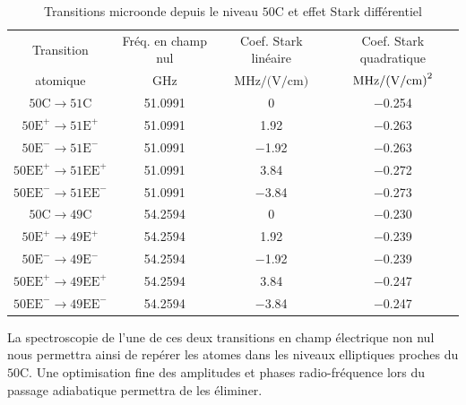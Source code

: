 %
\begin{table}[!h]
	\centering
	\caption[Transitions microonde depuis le niveau $\mathrm{50C}$ et effet Stark différentiel]{
	Transitions microonde depuis le niveau $\mathrm{50C}$ et effet Stark différentiel
	}
	\label{tab:Stark_49-50-51C}
	\begin{tabular}{cccc}
		\toprule\midrule
		Transition
		& Fréq. en champ nul
		& Coef. Stark linéaire
		& Coef. Stark quadratique
		\\
		atomique
		& $\si{\GHz}$
		& $\si{\MHz \per (\V \per\cm)}$
		& $\si{\MHz \per (\V \per\cm) \squared}$ \\
		\midrule
		$\mathrm{50C \rightarrow 51C}$
		& \SI{51.0991}{}
		& \SI{0}{}
		& \SI{-0.254}{} \\
		$\mathrm{50E^+ \rightarrow 51E^+}$
		& \SI{51.0991}{}
		& \SI[retain-explicit-plus]{+1.92}{}
		& \SI{-0.263}{} \\
		$\mathrm{50E^- \rightarrow 51E^-}$
		& \SI{51.0991}{}
		& \SI[retain-explicit-plus]{-1.92}{}
		& \SI{-0.263}{} \\
		$\mathrm{50EE^+ \rightarrow 51EE^+}$
		& \SI{51.0991}{}
		& \SI[retain-explicit-plus]{+3.84}{}
		& \SI{-0.272}{} \\
		$\mathrm{50EE^- \rightarrow 51EE^-}$
		& \SI{51.0991}{}
		& \SI[retain-explicit-plus]{-3.84}{}
		& \SI{-0.273}{} \\
		\midrule
		$\mathrm{50C \rightarrow 49C}$
		& \SI{54.2594}{}
		& \SI{0}{}
		& \SI{-0.230}{} \\
		$\mathrm{50E^+ \rightarrow 49E^+}$
		& \SI{54.2594}{}
		& \SI[retain-explicit-plus]{+1.92}{}
		& \SI{-0.239}{} \\
		$\mathrm{50E^- \rightarrow 49E^-}$
		& \SI{54.2594}{}
		& \SI[retain-explicit-plus]{-1.92}{}
		& \SI{-0.239}{} \\
		$\mathrm{50EE^+ \rightarrow 49EE^+}$
		& \SI{54.2594}{}
		& \SI[retain-explicit-plus]{+3.84}{}
		& \SI{-0.247}{} \\
		$\mathrm{50EE^- \rightarrow 49EE^-}$
		& \SI{54.2594}{}
		& \SI[retain-explicit-plus]{-3.84}{}
		& \SI{-0.247}{} \\
		\midrule
		\bottomrule
 	\end{tabular}
\end{table}
%
La spectroscopie de l'une de ces deux transitions en champ électrique non nul nous permettra ainsi de repérer les atomes dans les niveaux elliptiques proches du $\mathrm{50C}$.
Une optimisation fine des amplitudes et phases radio-fréquence lors du passage adiabatique permettra de les éliminer.

